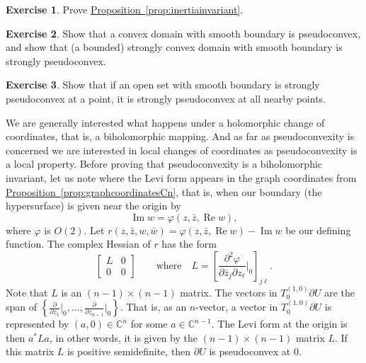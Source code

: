 \documentclass[12pt,openany]{book}
\renewcommand{\Re}{\operatorname{Re}}
\renewcommand{\Im}{\operatorname{Im}}
\newcommand{\C}{{\mathbb{C}}}
\theoremstyle{plain}
\theoremstyle{remark}
\theoremstyle{definition}
\newenvironment{exbox}{%
    \def\FrameCommand{\vrule width 1pt \relax\hspace{10pt}}%
    \MakeFramed{\advance\hsize-\width\FrameRestore}%
}{%
    \endMakeFramed
}
\theoremstyle{exercise}
\newtheorem{exercise}{Exercise}[section]
\theoremstyle{example}
\newcommand{\propref}[1]{\hyperref[#1]{Proposition~\ref*{#1}}}
\begin{document}
\begin{exbox}
\begin{exercise}
Prove \propref{prop:inertiainvariant}.
\end{exercise}

\begin{exercise}
Show that a convex domain with smooth boundary
is pseudoconvex, and show that (a bounded) strongly convex
domain with smooth boundary is strongly pseudoconvex.
\end{exercise}

\begin{exercise}
Show that if an open set with smooth boundary is strongly pseudoconvex at a point, it is strongly
pseudoconvex at all nearby points.
\end{exercise}
\end{exbox}

We are generally interested what happens under a holomorphic change of
coordinates, that is, a biholomorphic mapping.  And as far as pseudoconvexity
is concerned we are interested in local changes of coordinates as
pseudoconvexity is a local property.  Before proving 
that pseudoconvexity is a biholomorphic invariant, let us note where the
Levi form appears in the graph coordinates from 
\propref{prop:graphcoordinatesCn}, that is, when our boundary (the
hypersurface) is given near the origin by
\begin{equation*}
\Im w = \varphi(z,\bar{z},\Re w) ,
\end{equation*}
where $\varphi$ is $O(2)$.
Let $r(z,\bar{z},w,\bar{w}) = \varphi(z,\bar{z},\Re w) - \Im w$ be our
defining function.  The complex Hessian of $r$ has the form
\begin{equation*}
\begin{bmatrix}
L & 0 \\
0 & 0
\end{bmatrix}
\qquad \text{where} \quad
L = \left[
\frac{\partial^2 \varphi}{\partial \bar{z}_j \partial z_{\ell}}\Big|_0
\right]_{j \ell} .
\end{equation*}
Note that $L$ is an $(n-1) \times (n-1)$ matrix.
The vectors in $T_0^{(1,0)} \partial U$ are the span
of $\left\{
\frac{\partial}{\partial z_1}\big|_0,
\ldots,
\frac{\partial}{\partial z_{n-1}}\big|_0 \right\}$.
That is, as an $n$-vector,
a vector in $T_0^{(1,0)} \partial U$ is represented by $(a,0) \in \C^n$ for
some
$a \in \C^{n-1}$.  The Levi form at the origin is then $a^* L a$,
in other words, it is given by the $(n-1) \times (n-1)$ matrix $L$.
If this matrix $L$ is positive
semidefinite, then $\partial U$ is pseudoconvex at $0$.
\end{document}
